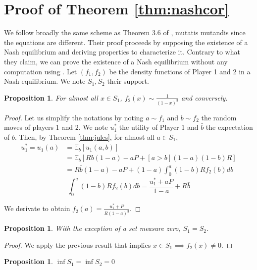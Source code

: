 \documentclass[preprint,12pt,authoryear,doubleblind]{elsarticle}
\newtheorem{proposition}[theorem]{Proposition}
\theoremstyle{definition}
\begin{document}
 




\appendix

\section{Proof of Theorem \ref{thm:nashcor}}
\label{proof:nashcor}

We follow broadly the same scheme as Theorem 3.6 of \citet{Lotker2008-tx}, mutatis mutandis since the equations are different. Their proof proceeds by supposing the existence of a Nash equilibrium and deriving properties to characterize it. Contrary to what they claim, we can prove the existence of a Nash equilibrium without any computation using \citet{Dasgupta1986-gu}. Let $(f_1, f_2)$ be the density functions of Player 1 and 2 in a Nash equilibrium. We note $S_1, S_2$ their support.
\begin{proposition}
    
For almost all $x \in S_1$, $f_2(x) \sim \frac{1}{(1-x)^3}$ and conversely.
\end{proposition} 
\begin{proof}
Let us simplify the notations by noting $a \sim f_1$ and $b \sim f_2$ the random moves of players 1 and 2.  We note $u_1^*$ the utility of Player 1 and $\bar b$ the expectation of $b$. Then, by Theorem \ref{thm:jules}, for almost all $a\in S_1$,
\begin{align*}u_1^* = u_1(a) &= \mathbb{E}_b[u_1(a, b)]\\
&= \mathbb{E}_b\left[Rb(1-a) - aP  + [a>b](1-a)(1-b)R\right]\\
&= R \bar b (1-a) - a P + (1-a) \int_0^a (1-b) R f_2(b) db\end{align*}
$$\int_0^a (1-b) R f_2(b) db = \frac{u_1^* + aP}{1-a} + R \bar b$$

We derivate to obtain $f_2(a) = \frac{u_1^* + P}{R(1-a)^3} $.
\end{proof}
\begin{proposition}
    With the exception of a set measure zero, $S_1 = S_2$.
\end{proposition} 
\begin{proof}We apply the previous result that implies $x \in S_1 \implies f_2(x) \neq 0$.\end{proof}
\begin{proposition}
    $\inf S_1 = \inf S_2 = 0$
\end{proposition}
\end{document}
